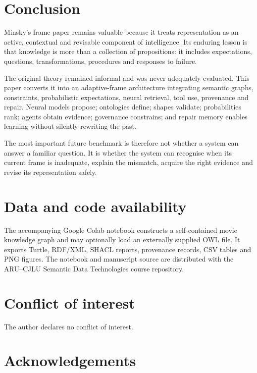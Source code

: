 \documentclass[11pt,a4paper]{article}
\begin{document}
\section{Conclusion}

Minsky's frame paper remains valuable because it treats representation as an
active, contextual and revisable component of intelligence. Its enduring lesson
is that knowledge is more than a collection of propositions: it includes
expectations, questions, transformations, procedures and responses to failure.

The original theory remained informal and was never adequately evaluated. This
paper converts it into an adaptive-frame architecture integrating semantic
graphs, constraints, probabilistic expectations, neural retrieval, tool use,
provenance and repair. Neural models propose; ontologies define; shapes validate;
probabilities rank; agents obtain evidence; governance constrains; and repair
memory enables learning without silently rewriting the past.

The most important future benchmark is therefore not whether a system can answer
a familiar question. It is whether the system can recognise when its current
frame is inadequate, explain the mismatch, acquire the right evidence and revise
its representation safely.

\section*{Data and code availability}

The accompanying Google Colab notebook constructs a self-contained movie
knowledge graph and may optionally load an externally supplied OWL file. It
exports Turtle, RDF/XML, SHACL reports, provenance records, CSV tables and PNG
figures. The notebook and manuscript source are distributed with the ARU--CJLU
Semantic Data Technologies course repository.

\section*{Conflict of interest}

The author declares no conflict of interest.

\section*{Acknowledgements}
\end{document}
